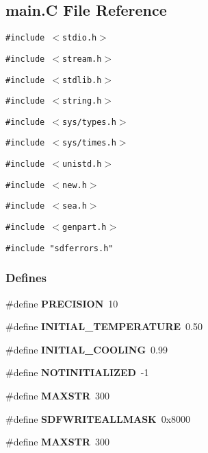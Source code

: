 \subsection{main.C File Reference}
\label{main.C}
{\tt \#include $<$stdio.h$>$}\par
{\tt \#include $<$stream.h$>$}\par
{\tt \#include $<$stdlib.h$>$}\par
{\tt \#include $<$string.h$>$}\par
{\tt \#include $<$sys/types.h$>$}\par
{\tt \#include $<$sys/times.h$>$}\par
{\tt \#include $<$unistd.h$>$}\par
{\tt \#include $<$new.h$>$}\par
{\tt \#include $<$sea.h$>$}\par
{\tt \#include $<$genpart.h$>$}\par
{\tt \#include "sdferrors.h"}\par
\subsubsection*{Defines}
\begin{CompactItemize}
\item 
\#define {\bf PRECISION}\ 10
\item 
\#define {\bf INITIAL\_\-TEMPERATURE}\ 0.50
\item 
\#define {\bf INITIAL\_\-COOLING}\ 0.99
\item 
\#define {\bf NOTINITIALIZED}\ -1
\item 
\#define {\bf MAXSTR}\ 300
\item 
\#define {\bf SDFWRITEALLMASK}\ 0x8000
\item 
\#define {\bf MAXSTR}\ 300
\end{CompactItemize}
